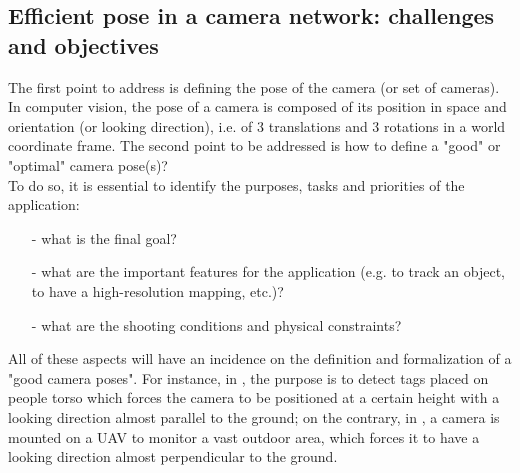 \subsection{Efficient pose in a camera network: challenges and objectives}
The first point to address is defining the pose of the camera (or set of cameras). In computer vision, the pose of a camera is composed of its position in space and orientation (or looking direction), i.e. of 3 translations and 3 rotations in a world coordinate frame. The second point to be addressed is how to define a "good" or "optimal" camera pose(s)?\\
 To do so, it is essential to identify the purposes, tasks and priorities of the application: 
 \begin{itemize}
 \item [-] what is the final goal?
 \item [-] what are the important features for the application (e.g. to track an object, to have a high-resolution mapping, etc.)?
 \item [-] what are the shooting conditions and physical constraints?
 \end{itemize}
   All of these aspects will have an incidence on the definition and formalization of a "good camera poses". For instance, in \cite{22*zhao2008}, the purpose is to detect tags placed on people torso which forces the camera to be positioned at a certain height with a looking direction almost parallel to the ground; on the contrary, in \cite{146*li2011}, a camera is mounted on a UAV to monitor a vast outdoor area, which forces it to have a looking direction almost perpendicular to the ground. 


